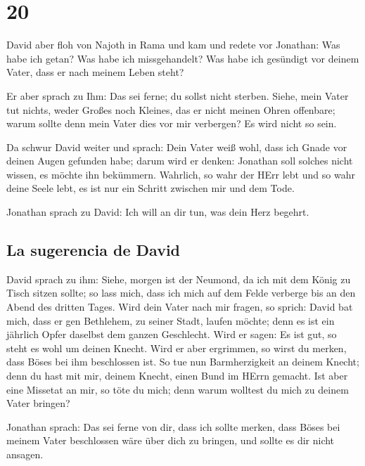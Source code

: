 \hypertarget{section-19}{%
\section{20}\label{section-19}}

 David aber floh von Najoth in Rama und kam und redete vor
Jonathan: Was habe ich getan? Was habe ich missgehandelt? Was habe ich
gesündigt vor deinem Vater, dass er nach meinem Leben steht?

 Er aber sprach zu Ihm: Das sei ferne; du sollst nicht
sterben. Siehe, mein Vater tut nichts, weder Großes noch Kleines, das er
nicht meinen Ohren offenbare; warum sollte denn mein Vater dies vor mir
verbergen? Es wird nicht so sein.

 Da schwur David weiter und sprach: Dein Vater weiß wohl,
dass ich Gnade vor deinen Augen gefunden habe; darum wird er denken:
Jonathan soll solches nicht wissen, es möchte ihn bekümmern. Wahrlich,
so wahr der HErr lebt und so wahr deine Seele lebt, es ist nur ein
Schritt zwischen mir und dem Tode.

 Jonathan sprach zu David: Ich will an dir tun, was dein
Herz begehrt.

\hypertarget{la-sugerencia-de-david}{%
\subsection{La sugerencia de David}\label{la-sugerencia-de-david}}

 David sprach zu ihm: Siehe, morgen ist der Neumond, da
ich mit dem König zu Tisch sitzen sollte; so lass mich, dass ich mich
auf dem Felde verberge bis an den Abend des dritten Tages.
 Wird dein Vater nach mir fragen, so sprich: David bat
mich, dass er gen Bethlehem, zu seiner Stadt, laufen möchte; denn es ist
ein jährlich Opfer daselbst dem ganzen Geschlecht.  Wird
er sagen: Es ist gut, so steht es wohl um deinen Knecht. Wird er aber
ergrimmen, so wirst du merken, dass Böses bei ihm beschlossen ist.
 So tue nun Barmherzigkeit an deinem Knecht; denn du hast
mit mir, deinem Knecht, einen Bund im HErrn gemacht. Ist aber eine
Missetat an mir, so töte du mich; denn warum wolltest du mich zu deinem
Vater bringen?

 Jonathan sprach: Das sei ferne von dir, dass ich sollte
merken, dass Böses bei meinem Vater beschlossen wäre über dich zu
bringen, und sollte es dir nicht ansagen.


